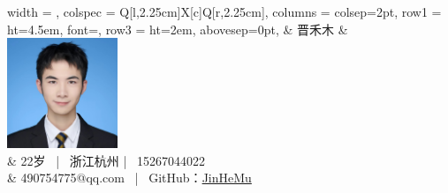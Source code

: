 \begin{tblr}{
    width = \linewidth,
    colspec = {Q[l,2.25cm]X[c]Q[r,2.25cm]},
    columns = {colsep=2pt},
    row{1} = {ht=4.5em, font=\Huge\scshape},
    row{3} = {ht=2em, abovesep=0pt},
  }
  & 晋禾木 &  \hspace{-3cm}\includegraphics[width=1.3in]{images/1} \\
	&  22岁 \ |   \ 浙江杭州 | \ 15267044022\\ 
	& \hspace{-0.5cm}490754775@qq.com \ |   \	GitHub：\href{https://github.com/JinHeMu}{JinHeMu}

\end{tblr}


